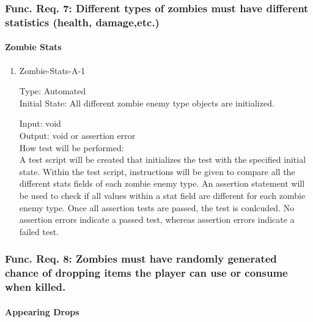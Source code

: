 \documentclass[12pt, titlepage]{article}
\begin{document}
\subsubsection{Func. Req. 7: Different types of zombies must have different statistics (health, damage,etc.)}

\paragraph{Zombie Stats}

\begin{enumerate}

\item{Zombie-Stats-A-1\\}

Type: Automated\\
					
Initial State: All different zombie enemy type objects are initialized.
					
Input: void \\
					
Output: void or assertion error \\
					
How test will be performed:\\ A test script will be created that initializes the test with the specified initial state. Within the test script, instructions will be given to compare all the different stats fields of each zombie enemy type. An assertion statement will be used to check if all values within a stat field are different for each zombie enemy type. Once all assertion tests are passed, the test is conlcuded. No assertion errors indicate a passed test, whereas assertion errors indicate a failed test.\\

\end{enumerate}

\subsubsection{Func. Req. 8: Zombies must have randomly generated chance of dropping items the player can use or consume when killed.}

\paragraph{Appearing Drops}
\end{document}
